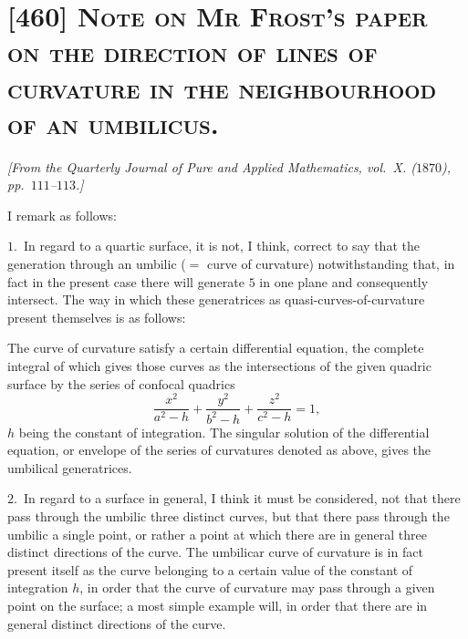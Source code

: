 \documentclass[11pt,a4paper]{article}
\begin{document}
\section*{[460] \textsc{Note on Mr Frost's paper on the direction of lines
of curvature in the neighbourhood of an umbilicus.}}

\begin{center}
\textit{[From the Quarterly Journal of Pure and Applied Mathematics,
vol.\ X. ($1870$), pp.\ $111$--$113$.]}
\end{center}

\medskip

I remark as follows:

\medskip

\noindent$1$.\ In regard to a quartic surface, it is not, I think, correct
to say that the generation through an umbilic ($=$ curve of curvature)
notwithstanding that, in fact in the present case there will generate $5$
in one plane and consequently intersect. The way in which these generatrices
as quasi-curves-of-curvature present themselves is as follows:

\medskip

The curve of curvature satisfy a certain differential equation, the
complete integral of which gives those curves as the intersections of the
given quadric surface by the series of confocal quadrics
\[
\frac{x^{2}}{a^{2} - h}
+ \frac{y^{2}}{b^{2} - h}
+ \frac{z^{2}}{c^{2} - h} = 1,
\]
$h$ being the constant of integration. The singular solution of the
differential equation, or envelope of the series of curvatures denoted as
above, gives the umbilical generatrices.

\medskip

\noindent$2$.\ In regard to a surface in general, I think it must be
considered, not that there pass through the umbilic three distinct curves,
but that there pass through the umbilic a single point, or rather a point
at which there are in general three distinct directions of the curve. The
umbilicar curve of curvature is in fact present itself as the curve belonging
to a certain value of the constant of integration $h$, in order that the
curve of curvature may pass through a given point on the surface; a most
simple example will, in order that there are in general distinct directions of
the curve.
\end{document}
